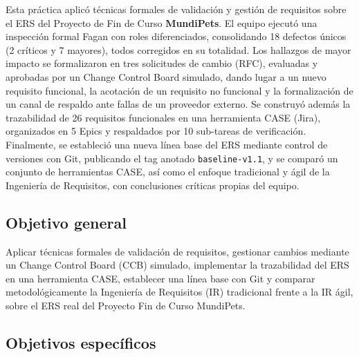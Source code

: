 \documentclass[journal,onecolumn]{IEEEtran}
\begin{document}
Esta práctica aplicó técnicas formales de validación y gestión de requisitos sobre el ERS del Proyecto de Fin de Curso \textbf{MundiPets}. El equipo ejecutó una inspección formal Fagan con roles diferenciados, consolidando 18 defectos únicos (2 críticos y 7 mayores), todos corregidos en su totalidad. Los hallazgos de mayor impacto se formalizaron en tres solicitudes de cambio (RFC), evaluadas y aprobadas por un Change Control Board simulado, dando lugar a un nuevo requisito funcional, la acotación de un requisito no funcional y la formalización de un canal de respaldo ante fallas de un proveedor externo. Se construyó además la trazabilidad de 26 requisitos funcionales en una herramienta CASE (Jira), organizados en 5 Epics y respaldados por 10 sub-tareas de verificación. Finalmente, se estableció una nueva línea base del ERS mediante control de versiones con Git, publicando el tag anotado \texttt{baseline-v1.1}, y se comparó un conjunto de herramientas CASE, así como el enfoque tradicional y ágil de la Ingeniería de Requisitos, con conclusiones críticas propias del equipo.
	
	\subsection{Objetivo general}
	
	Aplicar técnicas formales de validación de requisitos, gestionar cambios mediante un
	Change Control Board (CCB) simulado, implementar la trazabilidad del ERS en una
	herramienta CASE, establecer una línea base con Git y comparar metodológicamente la
	Ingeniería de Requisitos (IR) tradicional frente a la IR ágil, sobre el ERS real del
	Proyecto Fin de Curso MundiPets.
	
	\subsection{Objetivos específicos}
	
\end{document}
